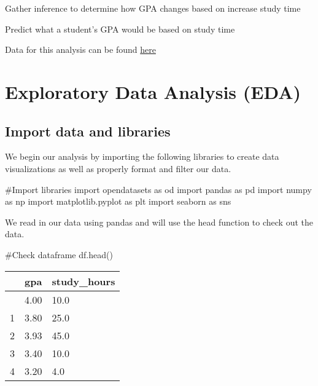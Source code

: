 \documentclass[
  letterpaper,
  DIV=11,
  numbers=noendperiod]{scrreprt}
\newenvironment{Shaded}{\begin{snugshade}}{\end{snugshade}}
\newcommand{\CommentTok}[1]{\textcolor[rgb]{0.37,0.37,0.37}{#1}}
\newcommand{\ImportTok}[1]{\textcolor[rgb]{0.00,0.46,0.62}{#1}}
\newcommand{\NormalTok}[1]{\textcolor[rgb]{0.00,0.23,0.31}{#1}}
\begin{document}
Gather inference to determine how GPA changes based on increase study
time

Predict what a student's GPA would be based on study time

Data for this analysis can be found
\href{https://www.kaggle.com/datasets/joebeachcapital/gpa-study-hours}{here}

\hypertarget{exploratory-data-analysis-eda}{%
\section{Exploratory Data Analysis
(EDA)}\label{exploratory-data-analysis-eda}}

\hypertarget{import-data-and-libraries}{%
\subsection{Import data and libraries}\label{import-data-and-libraries}}

We begin our analysis by importing the following libraries to create
data visualizations as well as properly format and filter our data.

\begin{Shaded}
\begin{Highlighting}[]
\CommentTok{\#Import libraries}
\ImportTok{import}\NormalTok{ opendatasets }\ImportTok{as}\NormalTok{ od}
\ImportTok{import}\NormalTok{ pandas }\ImportTok{as}\NormalTok{ pd}
\ImportTok{import}\NormalTok{ numpy }\ImportTok{as}\NormalTok{ np}
\ImportTok{import}\NormalTok{ matplotlib.pyplot }\ImportTok{as}\NormalTok{ plt}
\ImportTok{import}\NormalTok{ seaborn }\ImportTok{as}\NormalTok{ sns}
\end{Highlighting}
\end{Shaded}

We read in our data using pandas and will use the head function to check
out the data.

\begin{Shaded}
\begin{Highlighting}[]
\CommentTok{\#Check dataframe}
\NormalTok{df.head()}
\end{Highlighting}
\end{Shaded}

\begin{longtable}[]{@{}lll@{}}
\toprule\noalign{}
& gpa & study\_hours \\
\midrule\noalign{}
\endhead
\bottomrule\noalign{}
\endlastfoot
0 & 4.00 & 10.0 \\
1 & 3.80 & 25.0 \\
2 & 3.93 & 45.0 \\
3 & 3.40 & 10.0 \\
4 & 3.20 & 4.0 \\
\end{longtable}
\end{document}

